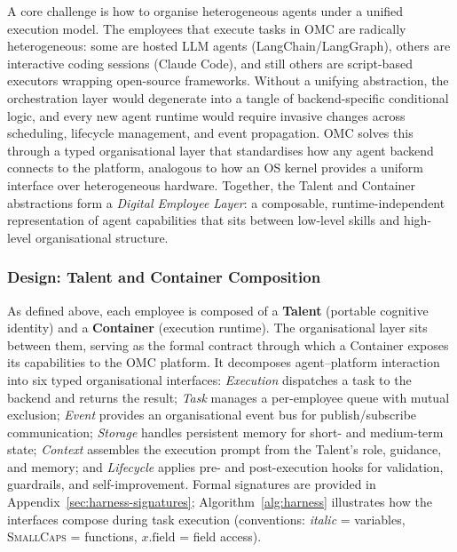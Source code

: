 \documentclass[11pt,a4paper]{article}
\begin{document}
A core challenge is how to organise heterogeneous agents under a unified execution model.  The employees that execute tasks in OMC are radically heterogeneous: some are hosted LLM agents (LangChain/LangGraph), others are interactive coding sessions (Claude Code), and still others are script-based executors wrapping open-source frameworks.  Without a unifying abstraction, the orchestration layer would degenerate into a tangle of backend-specific conditional logic, and every new agent runtime would require invasive changes across scheduling, lifecycle management, and event propagation.  OMC solves this through a typed organisational layer that standardises how any agent backend connects to the platform, analogous to how an OS kernel provides a uniform interface over heterogeneous hardware.  Together, the Talent and Container abstractions form a \emph{Digital Employee Layer}: a composable, runtime-independent representation of agent capabilities that sits between low-level skills and high-level organisational structure.

\subsubsection{Design: Talent and Container Composition}

As defined above, each employee is composed of a \textbf{Talent} (portable cognitive identity) and a \textbf{Container} (execution runtime).  The organisational layer sits between them, serving as the formal contract through which a Container exposes its capabilities to the OMC platform.  It decomposes agent--platform interaction into six typed organisational interfaces: \emph{Execution} dispatches a task to the backend and returns the result; \emph{Task} manages a per-employee queue with mutual exclusion; \emph{Event} provides an organisational event bus for publish/subscribe communication; \emph{Storage} handles persistent memory for short- and medium-term state; \emph{Context} assembles the execution prompt from the Talent's role, guidance, and memory; and \emph{Lifecycle} applies pre- and post-execution hooks for validation, guardrails, and self-improvement.  Formal signatures are provided in Appendix~\ref{sec:harness-signatures}; Algorithm~\ref{alg:harness} illustrates how the interfaces compose during task execution (conventions: \textit{italic} = variables, \textsc{SmallCaps} = functions, $x.\mathrm{field}$ = field access).
\end{document}
